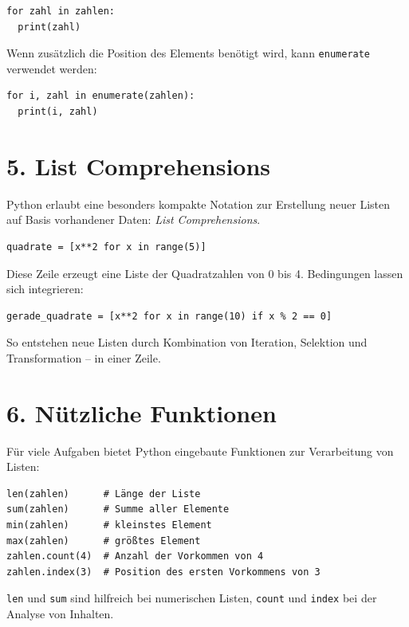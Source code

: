 \documentclass[12pt]{article}
\begin{document}
\begin{verbatim}
for zahl in zahlen:
  print(zahl)
\end{verbatim}
	
	Wenn zusätzlich die Position des Elements benötigt wird, kann \texttt{enumerate} verwendet werden:
	
\begin{verbatim}
for i, zahl in enumerate(zahlen):
  print(i, zahl)
\end{verbatim}
	
	\section*{5. List Comprehensions}
	
	Python erlaubt eine besonders kompakte Notation zur Erstellung neuer Listen auf Basis vorhandener Daten: \emph{List Comprehensions}.
	
\begin{verbatim}
quadrate = [x**2 for x in range(5)]
\end{verbatim}
	
	Diese Zeile erzeugt eine Liste der Quadratzahlen von 0 bis 4. Bedingungen lassen sich integrieren:
	
\begin{verbatim}
gerade_quadrate = [x**2 for x in range(10) if x % 2 == 0]
\end{verbatim}
	
	So entstehen neue Listen durch Kombination von Iteration, Selektion und Transformation – in einer Zeile.
	
	\section*{6. Nützliche Funktionen}
	
	Für viele Aufgaben bietet Python eingebaute Funktionen zur Verarbeitung von Listen:
	
\begin{verbatim}
len(zahlen)      # Länge der Liste
sum(zahlen)      # Summe aller Elemente
min(zahlen)      # kleinstes Element
max(zahlen)      # größtes Element
zahlen.count(4)  # Anzahl der Vorkommen von 4
zahlen.index(3)  # Position des ersten Vorkommens von 3
\end{verbatim}
	
	\texttt{len} und \texttt{sum} sind hilfreich bei numerischen Listen, \texttt{count} und \texttt{index} bei der Analyse von Inhalten.
	
\end{document}
